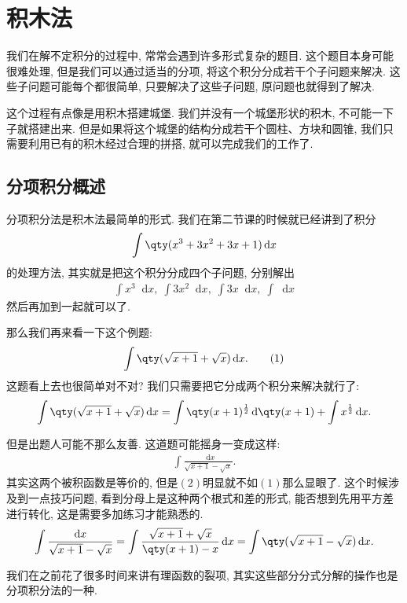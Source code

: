 \documentclass{ctexbook}
\newcommand*{\dif}{\mathop{}\!\mathrm{d}}
\begin{document}
{\section{积木法}
我们在解不定积分的过程中, 常常会遇到许多形式复杂的题目. 这个题目本身可能很难处理, 但是我们可以通过适当的分项, 将这个积分分成若干个子问题来解决. 这些子问题可能每个都很简单, 只要解决了这些子问题, 原问题也就得到了解决. \par
这个过程有点像是用积木搭建城堡. 我们并没有一个城堡形状的积木, 不可能一下子就搭建出来. 但是如果将这个城堡的结构分成若干个圆柱、方块和圆锥, 我们只需要利用已有的积木经过合理的拼搭, 就可以完成我们的工作了. \par
\subsection{分项积分概述}
分项积分法是积木法最简单的形式. 我们在第二节课的时候就已经讲到了积分
\begin{align*}
\int\qty(x^{3}+3x^{2}+3x+1)\dif{x}
\end{align*}
的处理方法, 其实就是把这个积分分成四个子问题, 分别解出
\begin{align*}
\int x^{3}\dif{x},\;\int3x^{2}\dif{x},\;\int3x\dif{x},\;\int\dif{x}
\end{align*}
然后再加到一起就可以了. \par
那么我们再来看一下这个例题: 
\begin{align*}
\int\qty(\sqrt{x+1}+\sqrt{x})\dif{x}.\tag{1}
\end{align*}
这题看上去也很简单对不对? 我们只需要把它分成两个积分来解决就行了: 
\begin{align*}
\int\qty(\sqrt{x+1}+\sqrt{x})\dif{x}=\int\qty(x+1)^{\frac{1}{2}}\dif{\qty(x+1)}+\int x^{\frac{1}{2}}\dif{x}
.\end{align*}\par
但是出题人可能不那么友善. 这道题可能摇身一变成这样: 
\begin{align*}
\int\frac{\dif{x}}{\sqrt{x+1}-\sqrt{x}}.\tag{2}
\end{align*}
其实这两个被积函数是等价的, 但是$(2)$明显就不如$(1)$那么显眼了. 这个时候涉及到一点技巧问题, 看到分母上是这种两个根式和差的形式, 能否想到先用平方差进行转化, 这是需要多加练习才能熟悉的. 
\begin{align*}
\int\frac{\dif{x}}{\sqrt{x+1}-\sqrt{x}}=\int\frac{\sqrt{x+1}+\sqrt{x}}{\qty(x+1)-x}\dif{x}=\int\qty(\sqrt{x+1}-\sqrt{x})\dif{x}
.\end{align*}\par
我们在之前花了很多时间来讲有理函数的裂项, 其实这些部分分式分解的操作也是分项积分法的一种. 
}
\end{document}
